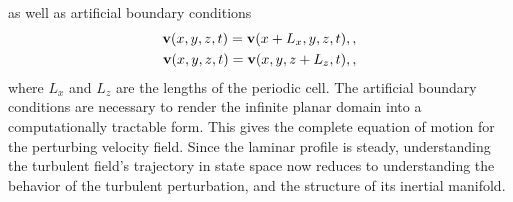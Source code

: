 as well as artificial boundary conditions 
\begin{align}
\mathbf{v}(x,y,z,t) = \mathbf{v}(x+L_x,y,z,t),\label{eq:periodicBCx},\\
\mathbf{v}(x,y,z,t) = \mathbf{v}(x,y,z+L_z,t),\label{eq:periodicBCz},
\end{align}
where $L_x$ and $L_z$ are the lengths of the periodic cell. The artificial boundary conditions are necessary to render the infinite planar domain into a computationally tractable form. This gives the complete equation of motion for the perturbing velocity field.  Since the laminar profile is steady, understanding the turbulent field's trajectory in state space now reduces to understanding the behavior of the turbulent perturbation, and the structure of its inertial manifold. 
